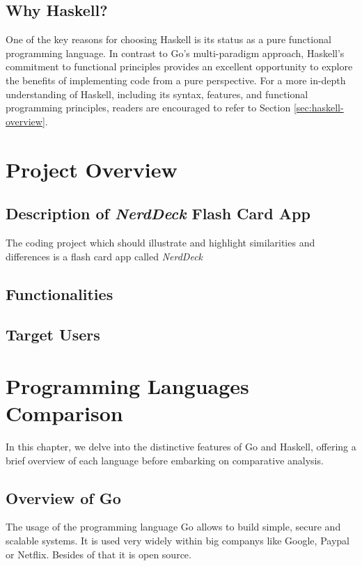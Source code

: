 \section{Why Haskell?}\label{sec:whyhaskell}
One of the key reasons for choosing Haskell is its status as a pure functional programming language. In contrast to Go's multi-paradigm approach, Haskell's commitment to functional principles provides an excellent opportunity to explore the benefits of implementing code from a pure perspective.
For a more in-depth understanding of Haskell, including its syntax, features, and functional programming principles, readers are encouraged to refer to Section \ref{sec:haskell-overview}.

\chapter{Project Overview}\label{chap:project-overview}
    \section{Description of \textit{NerdDeck} Flash Card App}\label{sec:description}
The coding project which should illustrate and highlight similarities and differences is a flash card app called \textit{NerdDeck}
    \section{Functionalities}\label{sec:functionalities}
    \section{Target Users}\label{sec:target-users}


\chapter{Programming Languages Comparison}\label{chap:language-comparison}
In this chapter, we delve into the distinctive features of Go and Haskell, offering a brief overview of each language before embarking on comparative analysis.

    \section{Overview of Go}\label{sec:go-overview}
The usage of the programming language Go allows to build simple, secure and scalable systems. It is used very widely within big companys like Google, Paypal or Netflix. Besides of that it is open source. \cite{GoWebsite}
